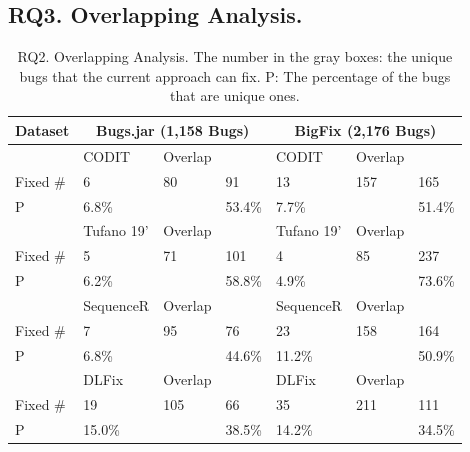 \subsection{RQ3. Overlapping Analysis.}
{\footnotesize{
\begin{table}[t]
	\caption{RQ2. Overlapping Analysis. The number in the gray boxes: the unique bugs that the current approach can fix. P: The percentage of the bugs that are unique ones.}
	\begin{center}
		\renewcommand{\arraystretch}{1}
		\begin{tabular}{p{0.8cm}<{\centering}|p{1.1cm}<{\centering}|p{0.8cm}<{\centering}|p{0.7cm}<{\centering}|p{1.1cm}<{\centering}|p{0.8cm}<{\centering}|p{0.7cm}<{\centering}}\hline
			Dataset&\multicolumn{3}{c|}{Bugs.jar (1,158 Bugs)}&\multicolumn{3}{c}{BigFix (2,176 Bugs)}\\
			\hline
			             & CODIT   & Overlap   & \tool  & CODIT   & Overlap   & \tool \\
			\hline
			Fixed \#     & \cellcolor{mygray} 6  & 80   & \cellcolor{mygray} 91  & \cellcolor{mygray} 13 &  157  & \cellcolor{mygray} 165 \\
			P            & 6.8\%   &    & 53.4\%  & 7.7\%   &    & 51.4\% \\
			\hline
			             & Tufano 19'   & Overlap   & \tool  & Tufano 19'   & Overlap   & \tool \\
			\hline
			Fixed \#     & \cellcolor{mygray} 5  &  71  & \cellcolor{mygray} 101 & \cellcolor{mygray}4 & 85   & \cellcolor{mygray}237 \\
			P            &  6.2\%  &    &  58.8\% &  4.9\%  &    & 73.6\% \\
			\hline
			             & SequenceR   & Overlap   & \tool  & SequenceR   & Overlap   & \tool \\
			\hline
			Fixed \#     & \cellcolor{mygray} 7  &   95 & \cellcolor{mygray} 76 & \cellcolor{mygray} 23 &  158  & \cellcolor{mygray} 164 \\
			P            &   6.8\% &    & 44.6\%  &   11.2\% &    & 50.9\% \\
			\hline
			             & DLFix   & Overlap   & \tool  & DLFix   & Overlap   & \tool \\
			\hline
			Fixed \#     & \cellcolor{mygray}  19 &  105  & \cellcolor{mygray} 66 & \cellcolor{mygray}35 &  211  & \cellcolor{mygray}111 \\
			P            &  15.0\%  &    & 38.5\%  &  14.2\%  &    &  34.5\%\\

\end{tabular}
\end{center}
\end{table}}}
